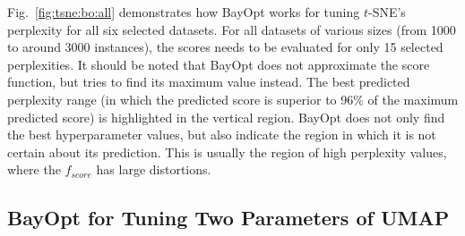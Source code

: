 Fig.~\ref{fig:tsne:bo:all} demonstrates how BayOpt works for tuning $t$-SNE's perplexity for all six selected datasets.
For all datasets of various sizes (from 1000 to around 3000 instances), the scores needs to be evaluated for only 15 selected perplexities.
It should be noted that BayOpt does not approximate the score function, but tries to find its maximum value instead.
The best predicted perplexity range (in which the predicted score is superior to 96\% of the maximum predicted score) is highlighted in the vertical region.
BayOpt does not only find the best hyperparameter values, but also indicate the region in which it is not certain about its prediction.
This is usually the region of high perplexity values, where the $f_{score}$ has large distortions.

\subsection{BayOpt for Tuning Two Parameters of UMAP}\label{sec:result:bo:umap}

